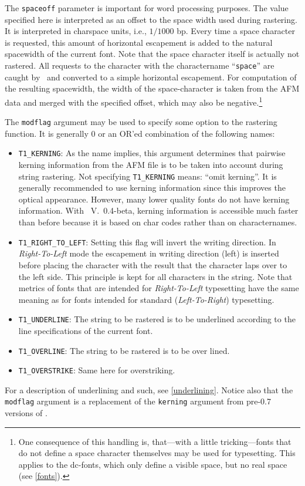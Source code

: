 The \verb+spaceoff+ parameter is important for word processing
purposes. The value specified here is interpreted as an offset to the
space width used during rastering. It is interpreted in charspace
units, i.e., $1/1000$ bp. Every time a space character is requested,
this amount of horizontal escapement is added to the natural
spacewidth of the current font. Note that the space character itself
is actually not rastered. All requests to the character with the
charactername ``\verb+space+'' are caught by \tonelib\ and converted
to a simple horizontal escapement. For computation of the resulting
spacewidth, the width of the space-character is taken from the
AFM data and merged with the specified offset, which may also be
negative.\footnote{One consequence of this handling is, that---with a
  little tricking---fonts that do not define a space character
  themselves may be used for typesetting. This applies to the
  dc-fonts, which only define a visible space, but no real space (see
  \ref{fonts}).}

The \verb+modflag+ argument may be used to specify some option to the
rastering function. It is generally 0 or an OR'ed combination of the following
names:
\begin{itemize}
\item \verb+T1_KERNING+: As the name implies, this argument
  determines that pairwise kerning information from the AFM file is to be taken
  into account during string rastering. Not specifying \verb+T1_KERNING+ 
  means: ``omit kerning''. It is generally
  recommended to use kerning information since this improves the optical
  appearance. However, many lower quality fonts do not have kerning
  information.  With \tonelib\ V.\ 0.4-beta, kerning information is accessible
  much faster than before because it is based on char codes rather than on
  characternames.
\item \verb+T1_RIGHT_TO_LEFT+: Setting this flag will invert the writing
  direction. In {\em Right-To-Left} mode the escapement in writing direction
  (left) is inserted before placing the character with the result that the
  character laps over to the left side. This principle is kept for all
  characters in the string. Note that metrics of fonts that are intended for
  {\em Right-To-Left} typesetting have the same meaning as for fonts intended
  for standard ({\em Left-To-Right}) typesetting.
\item \verb+T1_UNDERLINE+: The string to be rastered is to be underlined
  according to the line specifications of the current font. 
\item \verb+T1_OVERLINE+: The string to be rastered is to be over lined.
\item \verb+T1_OVERSTRIKE+: Same here for overstriking. 
\end{itemize}
For a description of underlining and such, see \ref{underlining}. Notice also
that the \verb+modflag+ argument is a replacement of the \verb+kerning+
argument from pre-0.7 versions of \tonelib.

